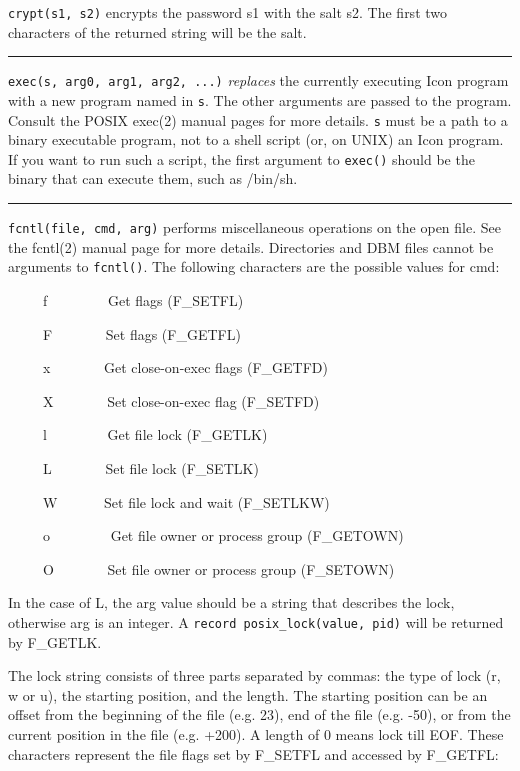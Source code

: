 \noindent
\texttt{crypt(s1, s2)} encrypts the password s1 with the salt s2. The first two
characters of the returned string will be the salt.

\bigskip\hrule\vspace{0.1cm}

\noindent
\texttt{exec(s, arg0, arg1, arg2, ...)}
\textit{replaces} the currently executing
Icon program with a new program named in \texttt{s}. The other arguments are
passed to the program. Consult the POSIX exec(2) manual pages for more
details. \texttt{s} must be a path to a binary executable program, not
to a shell script (or, on UNIX) an Icon program. If you want to run
such a script, the first argument to \texttt{exec()} should be the binary that
can execute them, such as /bin/sh.

\bigskip\hrule\vspace{0.1cm}

\noindent
\texttt{fcntl(file, cmd, arg)} performs miscellaneous operations on the open
file. See the fcntl(2) manual page for more details. Directories and
DBM files cannot be arguments to \texttt{fcntl()}. The following characters are
the possible values for cmd: 

\ \ \ \ \ f \ \ \ \ \ \ \ \ Get flags (F\_SETFL)

\ \ \ \ \ F \ \ \ \ \ \ \ Set flags (F\_GETFL)

\ \ \ \ \ x \ \ \ \ \ \ \ Get close-on-exec flags (F\_GETFD)

\ \ \ \ \ X \ \ \ \ \ \ \ Set close-on-exec flag (F\_SETFD)

\ \ \ \ \ l \ \ \ \ \ \ \ \ Get file lock (F\_GETLK)

\ \ \ \ \ L \ \ \ \ \ \ \ Set file lock (F\_SETLK)

\ \ \ \ \ W \ \ \ \ \ \ Set file lock and wait (F\_SETLKW)

\ \ \ \ \ o \ \ \ \ \ \ \ \ Get file owner or process group (F\_GETOWN)

\ \ \ \ \ O \ \ \ \ \ \ \ Set file owner or process group (F\_SETOWN)

In the case of L, the arg value should be a string that describes the
lock, otherwise arg is an integer. A \texttt{record posix\_lock(value,
pid)} will be returned by F\_GETLK.

The lock string consists of three parts separated by commas: the type of
lock (r, w or u), the starting position, and the length. The starting
position can be an offset from the beginning of the file (e.g. 23), end
of the file (e.g. -50), or from the current position in the file (e.g.
+200). A length of 0 means lock till EOF. These characters represent
the file flags set by F\_SETFL and accessed by F\_GETFL: 

